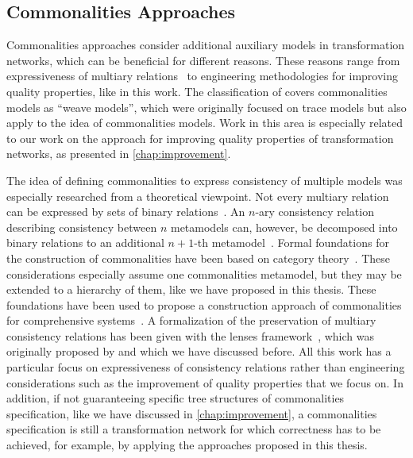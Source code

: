 \subsection{Commonalities Approaches}

Commonalities approaches consider additional auxiliary models in transformation networks, which can be beneficial for different reasons.
These reasons range from expressiveness of multiary relations~\cite{stevens2020BidirectionalTransformationLarge-SoSym,stunkel2018MultimodelCorrespondence-ICPS} to engineering methodologies for improving quality properties, like in this work.
The classification of \textcite{kolovos2008a} covers commonalities models as \enquote{weave models}, which were originally focused on trace models but also apply to the idea of commonalities models.
Work in this area is especially related to our work on the \commonalities approach for improving quality properties of transformation networks, as presented in \autoref{chap:improvement}.

The idea of defining commonalities to express consistency of multiple models was especially researched from a theoretical viewpoint.
Not every multiary relation can be expressed by sets of binary relations~\cite{stevens2020BidirectionalTransformationLarge-SoSym}.
An $n$-ary consistency relation describing consistency between $n$ metamodels can, however, be decomposed into binary relations to an additional $n+1$-th metamodel~\cite{stevens2020BidirectionalTransformationLarge-SoSym}.
Formal foundations for the construction of commonalities have been based on category theory~\cite{stunkel2018MultimodelCorrespondence-ICPS}.
These considerations especially assume one commonalities metamodel, but they may be extended to a hierarchy of them, like we have proposed in this thesis.
These foundations have been used to propose a construction approach of commonalities for comprehensive systems~\cite{stunkel2020MultipleModelSynchronization-FASE}.
A formalization of the preservation of multiary consistency relations has been given with the lenses framework~\cite{diskin2018MultiModelSynchronization-FASE}, which was originally proposed by \textcite{foster2007combinators-TPLS} and which we have discussed before.
All this work has a particular focus on expressiveness of consistency relations rather than engineering considerations such as the improvement of quality properties that we focus on.
In addition, if not guaranteeing specific tree structures of commonalities specification, like we have discussed in \autoref{chap:improvement}, a commonalities specification is still a transformation network for which correctness has to be achieved, for example, by applying the approaches proposed in this thesis.

